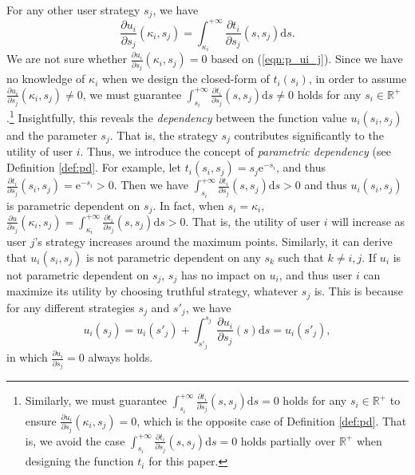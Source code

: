 \documentclass[conference]{IEEEtran}
\theoremstyle{definition}
\begin{document}
{For any other user strategy $s_j$, we have
\begin{equation}
\label{eqn:p_ui_j}
\frac{\partial u_i}{\partial s_j}(\kappa_i,s_j)=\int_{\kappa_i}^{+\infty}\frac{\partial t_i}{\partial s_j}(s,s_j)\mathrm{d}s.
\end{equation}
We are not sure whether $\frac{\partial u_i}{\partial s_j}(\kappa_i,s_j)=0$ based on (\ref{eqn:p_ui_j}). Since we have no knowledge of $\kappa_i$ when we design the closed-form of $t_i(s_i)$, in order to assume $\frac{\partial u_i}{\partial s_j}(\kappa_i,s_j)\not=0$, we must guarantee $\int_{s_i}^{+\infty}\frac{\partial t_i}{\partial s_j}(s,s_j)\mathrm{d}s\not=0$ holds for any $s_i\in\mathbb{R}^+$.\footnote{Similarly, we must guarantee $\int_{s_i}^{+\infty}\frac{\partial t_i}{\partial s_j}(s,s_j)\mathrm{d}s=0$ holds for any $s_i\in\mathbb{R}^+$ to ensure $\frac{\partial u_i}{\partial s_j}(\kappa_i,s_j)=0$, which is the opposite case of Definition \ref{def:pd}. That is, we avoid the case $\int_{s_i}^{+\infty}\frac{\partial t_i}{\partial s_j}(s,s_j)\mathrm{d}s=0$ holds partially over $\mathbb{R}^+$ when designing the function $t_i$ for this paper.} Insightfully, this reveals the \emph{dependency} between the function value $u_i(s_i,s_j)$ and the parameter $s_j$. That is, the strategy $s_j$ contributes significantly to the utility of user $i$. Thus, we introduce the concept of \emph{parametric dependency} (see Definition \ref{def:pd}. 
For example, let $t_i(s_i,s_j)=s_j\mathrm{e}^{-s_i}$, and thus $\frac{\partial t_i}{\partial s_j}(s_i,s_j)=\mathrm{e}^{-s_i}>0$. Then we have $\int_{s_i}^{+\infty}\frac{\partial t_i}{\partial s_j}(s,s_j)\mathrm{d}s>0$ and thus $u_i(s_i,s_j)$ is parametric dependent on $s_j$. In fact, when $s_i=\kappa_i$, $\frac{\partial u}{\partial s_j}(\kappa_i,s_j)=\int_{\kappa_i}^{+\infty}\frac{\partial t_i}{\partial s_j}(s,s_j)\mathrm{d}s>0$. That is, the utility of user $i$ will increase as user $j$\rq{}s strategy increases around the maximum points. Similarly, it can derive that $u_i(s_i,s_j)$ is not parametric dependent on any $s_k$ such that $k\not=i,j$. If $u_i$ is not parametric dependent on $s_j$, $s_j$ has no impact on $u_i$, and thus user $i$ can maximize its utility by choosing truthful strategy, whatever $s_j$ is. This is because for any different strategies $s_j$ and $s'_j$, we have
\begin{equation}
\label{eqn:unpd}
u_i(s_j)=u_i(s'_j)+\int_{s'_j}^{s_j}\frac{\partial u_i}{\partial s_j}(s)\mathrm{d}s=u_i(s'_j),
\end{equation}
in which $\frac{\partial u_i}{\partial s_j}=0$ always holds.
}
\end{document}
